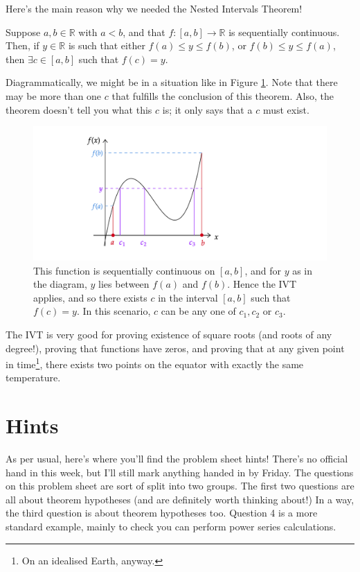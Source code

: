 \documentclass[
  17pt,
  a4paper]{extarticle}
\theoremstyle{plain}
\theoremstyle{plain}
\theoremstyle{plain}
\theoremstyle{plain}
\theoremstyle{plain}
\theoremstyle{definition}
\theoremstyle{definition}
\theoremstyle{definition}
\theoremstyle{remark}
\let\BeginKnitrBlock\begin \let\EndKnitrBlock\end
\renewcommand{\;}{\,}
\begin{document}
Here's the main reason why we needed the Nested Intervals Theorem!

\BeginKnitrBlock{theorem}[Intermediate Value Theorem (IVT)]
{\label{thm:thm2} }Suppose \(a,b \in \mathbb{R}\) with \(a < b\), and that \(f:[a,b] \to \mathbb{R}\) is sequentially continuous. Then, if \(y \in \mathbb{R}\) is such that either \(f(a) \leq y \leq f(b)\), or \(f(b) \leq y \leq f(a)\), then \(\exists c \in [a,b]\) such that \(f(c) = y\).
\EndKnitrBlock{theorem}
Diagrammatically, we might be in a situation like in Figure \ref{fig:ivt}. Note that there may be more than one \(c\) that fulfills the conclusion of this theorem. Also, the theorem doesn't tell you what this \(c\) is; it only says that a \(c\) must exist.

\begin{figure}
\includegraphics[width=\Width,height=\Height]{ivt} \caption{This function is sequentially continuous on $[a,b]$, and for $y$ as in the diagram, $y$ lies between $f(a)$ and $f(b)$. Hence the IVT applies, and so there exists $c$ in the interval $[a,b]$ such that $f(c)=y$. In this scenario, $c$ can be any one of $c_1,c_2$ or $c_3$.}\label{fig:ivt}
\end{figure}

The IVT is very good for proving existence of square roots (and roots of any degree!), proving that functions have zeros, and proving that at any given point in time\footnote{On an idealised Earth, anyway.}, there exists two points on the equator with exactly the same temperature.

\hypertarget{hints}{%
\section{Hints}\label{hints}}

As per usual, here's where you'll find the problem sheet hints! There's no official hand in this week, but I'll still mark anything handed in by Friday. The questions on this problem sheet are sort of split into two groups. The first two questions are all about theorem hypotheses (and are definitely worth thinking about!) In a way, the third question is about theorem hypotheses too. Question 4 is a more standard example, mainly to check you can perform power series calculations.
\end{document}
